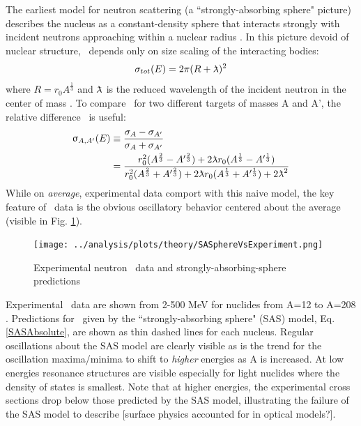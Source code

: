 The earliest model for neutron scattering (a ``strongly-absorbing sphere"
picture) describes the nucleus as a constant-density sphere that interacts
strongly with incident neutrons approaching within a nuclear radius
\cite{Feshbach1949}. In this picture devoid of nuclear structure, \tot\ depends
only on size scaling of the interacting bodies:
\begin{equation} \label{SASAbsolute}
    \sigma_{tot}(E) = 2\pi(R + \lambdabar)^{2}
\end{equation}
where $R=r_{0}A^{\frac{1}{3}}$ and $\lambdabar$ is the reduced wavelength
of the incident neutron in the center of mass \cite{Fernbach1949, Satchler1980}. 
To compare \tot\ for two different targets of masses A and A', the relative
difference \totRD\ is useful:
\begin{equation} \label{SASRelDiff}
    \begin{split}
        \totRD & \equiv
    \frac{\sigma_{A}-\sigma_{A'}}{\sigma_{A}+\sigma_{A'}} \\
    & =
    \frac{r_{0}^{2}(A^{\frac{2}{3}}-A'^{\frac{2}{3}}) +
    2\lambdabar r_{0}(A^{\frac{1}{3}}-A'^{\frac{1}{3}})}
    {r_{0}^{2}(A^{\frac{2}{3}}+A'^{\frac{2}{3}}) +
    2\lambdabar r_{0}(A^{\frac{1}{3}}+A'^{\frac{1}{3}}) + 2\lambdabar^{2}}
    \end{split}
\end{equation}
While on \textit{average}, experimental data comport with this naive
model, the key feature of \tot\ data is the obvious oscillatory
behavior centered about the average (visible in Fig.
\ref{SASphereVsExperiment}).

\begin{figure}
    \texttt{[image: ../analysis/plots/theory/SASphereVsExperiment.png]}
    \caption{Experimental neutron \tot\ data and strongly-absorbing-sphere predictions}
    \label{SASphereVsExperiment}
\end{figure}

Experimental \tot\ data are shown from 2-500
MeV for nuclides from A=12 to A=208
\cite{Finlay1993, Schwartz1974, Poenitz1983, Abfalterer2000, Abfalterer2001}.
Predictions for \tot\ given by the ``strongly-absorbing sphere" (SAS)
model, Eq. \ref{SASAbsolute}, are shown as thin dashed lines for each nucleus.
Regular oscillations about the SAS model are clearly visible
as is the trend for the oscillation
maxima/minima to shift to \textit{higher} energies as A is increased. At low energies 
resonance structures are visible especially for light nuclides where the
density of states is smallest. Note that at higher energies, the experimental
cross sections drop below those predicted by the SAS model, illustrating
the failure of the SAS model to describe [surface physics accounted for in
optical models?].


